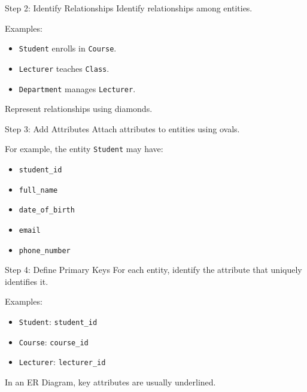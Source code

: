 \documentclass[aspectratio=169,11pt]{beamer}
\newcommand{\smallitem}{\setlength{\itemsep}{2pt}\setlength{\parskip}{0pt}}
\begin{document}
\begin{frame}{Step 2: Identify Relationships}
\small
Identify relationships among entities.

\vspace{2mm}
Examples:
\begin{itemize}
\smallitem
  \item \texttt{Student} enrolls in \texttt{Course}.
  \item \texttt{Lecturer} teaches \texttt{Class}.
  \item \texttt{Department} manages \texttt{Lecturer}.
\end{itemize}

Represent relationships using diamonds.
\end{frame}

\begin{frame}{Step 3: Add Attributes}
\small
Attach attributes to entities using ovals.

\vspace{2mm}
For example, the entity \texttt{Student} may have:
\begin{itemize}
\smallitem
  \item \texttt{student\_id}
  \item \texttt{full\_name}
  \item \texttt{date\_of\_birth}
  \item \texttt{email}
  \item \texttt{phone\_number}
\end{itemize}
\end{frame}

\begin{frame}{Step 4: Define Primary Keys}
\small
For each entity, identify the attribute that uniquely identifies it.

\vspace{2mm}
Examples:
\begin{itemize}
\smallitem
  \item \texttt{Student}: \texttt{student\_id}
  \item \texttt{Course}: \texttt{course\_id}
  \item \texttt{Lecturer}: \texttt{lecturer\_id}
\end{itemize}

In an ER Diagram, key attributes are usually underlined.
\end{frame}
\end{document}
